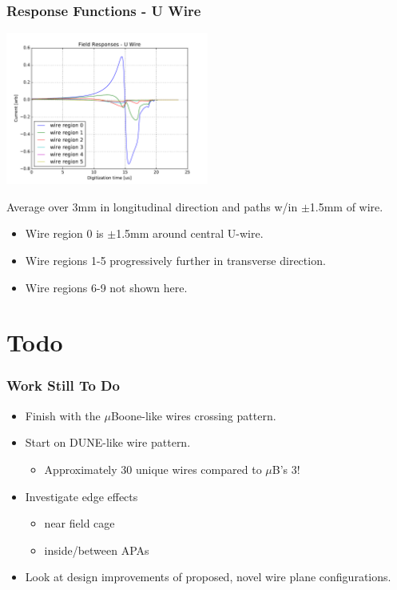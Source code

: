 \documentclass[xcolor=dvipsnames]{beamer}
\begin{document}
\begin{frame}
  \frametitle{Response Functions - U Wire}
  \begin{center}
    \includegraphics[height=5cm,clip,trim=0 0cm 0 0cm]{current-responses.pdf}
  \end{center}
  \footnotesize 
  Average over 3mm in longitudinal direction and  paths w/in $\pm$1.5mm of wire.
  \begin{itemize}
  \item Wire region 0 is $\pm$1.5mm around central U-wire.
  \item Wire regions 1-5 progressively further in transverse direction.
  \item Wire regions 6-9 not shown here.
  \end{itemize}
\end{frame}

\section{Todo}

\begin{frame}
  \frametitle{Work Still To Do}
  \begin{itemize}
  \item Finish with the $\mu$Boone-like wires crossing pattern.
  \item Start on DUNE-like wire pattern.
    \begin{itemize}\footnotesize
    \item Approximately 30 unique wires compared to $\mu$B's 3!
    \end{itemize}
  \item Investigate edge effects 
    \begin{itemize}\footnotesize
    \item near field cage
    \item inside/between APAs
    \end{itemize}
  \item Look at design improvements of proposed, novel wire plane configurations.
  \end{itemize}
\end{frame}
\end{document}
